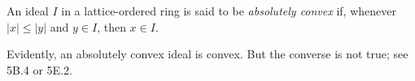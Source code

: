 An ideal $I$ in a lattice-ordered ring is said to be \emph{absolutely convex} if, whenever $|x| \leq |y|$ and $y \in I$, then $x \in I$.

Evidently, an absolutely convex ideal is convex. But the converse is not true; see 5B.4 or 5E.2.
